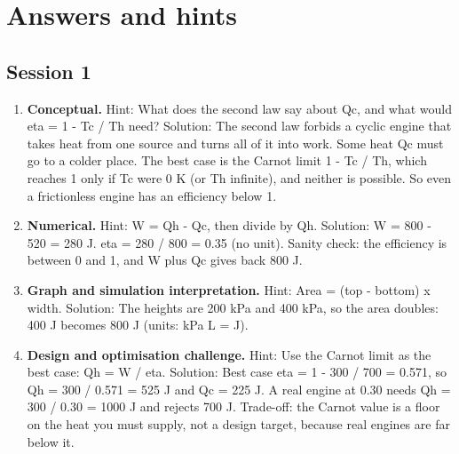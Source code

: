 \documentclass[11pt,a4paper]{article}
\begin{document}
\section{Answers and hints}

\subsection*{Session 1}
\begin{enumerate}[nosep]
\item \textbf{Conceptual.} Hint: What does the second law say about Qc, and what would eta = 1 - Tc / Th need? Solution: The second law forbids a cyclic engine that takes heat from one source and turns all of it into work. Some heat Qc must go to a colder place. The best case is the Carnot limit 1 - Tc / Th, which reaches 1 only if Tc were 0 K (or Th infinite), and neither is possible. So even a frictionless engine has an efficiency below 1.
\item \textbf{Numerical.} Hint: W = Qh - Qc, then divide by Qh. Solution: W = 800 - 520 = 280 J. eta = 280 / 800 = 0.35 (no unit). Sanity check: the efficiency is between 0 and 1, and W plus Qc gives back 800 J.
\item \textbf{Graph and simulation interpretation.} Hint: Area = (top - bottom) x width. Solution: The heights are 200 kPa and 400 kPa, so the area doubles: 400 J becomes 800 J (units: kPa L = J).
\item \textbf{Design and optimisation challenge.} Hint: Use the Carnot limit as the best case: Qh = W / eta. Solution: Best case eta = 1 - 300 / 700 = 0.571, so Qh = 300 / 0.571 = 525 J and Qc = 225 J. A real engine at 0.30 needs Qh = 300 / 0.30 = 1000 J and rejects 700 J. Trade-off: the Carnot value is a floor on the heat you must supply, not a design target, because real engines are far below it.
\end{enumerate}
\end{document}
